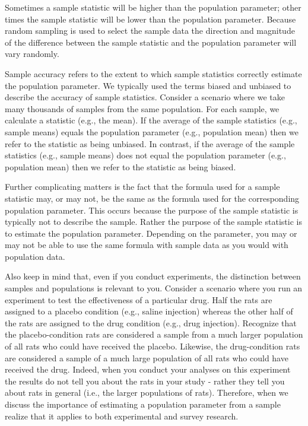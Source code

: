 \documentclass[
]{krantz}
\begin{document}
Sometimes a sample statistic will be higher than the population parameter; other times the sample statistic will be lower than the population parameter. Because random sampling is used to select the sample data the direction and magnitude of the difference between the sample statistic and the population parameter will vary randomly.

Sample accuracy refers to the extent to which sample statistics correctly estimate the population parameter. We typically used the terms biased and unbiased to describe the accuracy of sample statistics. Consider a scenario where we take many thousands of samples from the same population. For each sample, we calculate a statistic (e.g., the mean). If the average of the sample statistics (e.g., sample means) equals the population parameter (e.g., population mean) then we refer to the statistic as being unbiased. In contrast, if the average of the sample statistics (e.g., sample means) does not equal the population parameter (e.g., population mean) then we refer to the statistic as being biased.

Further complicating matters is the fact that the formula used for a sample statistic may, or may not, be the same as the formula used for the corresponding population parameter. This occurs because the purpose of the sample statistic is typically not to describe the sample. Rather the purpose of the sample statistic is to estimate the population parameter. Depending on the parameter, you may or may not be able to use the same formula with sample data as you would with population data.

Also keep in mind that, even if you conduct experiments, the distinction between samples and populations is relevant to you. Consider a scenario where you run an experiment to test the effectiveness of a particular drug. Half the rats are assigned to a placebo condition (e.g., saline injection) whereas the other half of the rats are assigned to the drug condition (e.g., drug injection). Recognize that the placebo-condition rats are considered a sample from a much larger population of all rats who could have received the placebo. Likewise, the drug-condition rats are considered a sample of a much large population of all rats who could have received the drug. Indeed, when you conduct your analyses on this experiment the results do not tell you about the rats in your study - rather they tell you about rats in general (i.e., the larger populations of rats). Therefore, when we discuss the importance of estimating a population parameter from a sample realize that it applies to both experimental and survey research.
\end{document}
